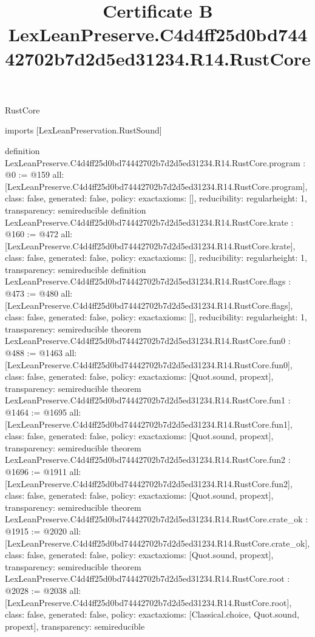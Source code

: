 \begin{lexlean}{RustCore}
\title{Certificate B LexLeanPreserve.C4d4ff25d0bd74442702b7d2d5ed31234.R14.RustCore}
\begin{coremodule}
imports [LexLeanPreservation.RustSound]

definition LexLeanPreserve.C4d4ff25d0bd74442702b7d2d5ed31234.R14.RustCore.program : @0 := @159 {
  all: [LexLeanPreserve.C4d4ff25d0bd74442702b7d2d5ed31234.R14.RustCore.program],
  class: false,
  generated: false,
  policy: exact{axioms: []},
  reducibility: regular{height: 1},
  transparency: semireducible
}
definition LexLeanPreserve.C4d4ff25d0bd74442702b7d2d5ed31234.R14.RustCore.krate : @160 := @472 {
  all: [LexLeanPreserve.C4d4ff25d0bd74442702b7d2d5ed31234.R14.RustCore.krate],
  class: false,
  generated: false,
  policy: exact{axioms: []},
  reducibility: regular{height: 1},
  transparency: semireducible
}
definition LexLeanPreserve.C4d4ff25d0bd74442702b7d2d5ed31234.R14.RustCore.flags : @473 := @480 {
  all: [LexLeanPreserve.C4d4ff25d0bd74442702b7d2d5ed31234.R14.RustCore.flags],
  class: false,
  generated: false,
  policy: exact{axioms: []},
  reducibility: regular{height: 1},
  transparency: semireducible
}
theorem LexLeanPreserve.C4d4ff25d0bd74442702b7d2d5ed31234.R14.RustCore.fun0 : @488 := @1463 {
  all: [LexLeanPreserve.C4d4ff25d0bd74442702b7d2d5ed31234.R14.RustCore.fun0],
  class: false,
  generated: false,
  policy: exact{axioms: [Quot.sound, propext]},
  transparency: semireducible
}
theorem LexLeanPreserve.C4d4ff25d0bd74442702b7d2d5ed31234.R14.RustCore.fun1 : @1464 := @1695 {
  all: [LexLeanPreserve.C4d4ff25d0bd74442702b7d2d5ed31234.R14.RustCore.fun1],
  class: false,
  generated: false,
  policy: exact{axioms: [Quot.sound, propext]},
  transparency: semireducible
}
theorem LexLeanPreserve.C4d4ff25d0bd74442702b7d2d5ed31234.R14.RustCore.fun2 : @1696 := @1911 {
  all: [LexLeanPreserve.C4d4ff25d0bd74442702b7d2d5ed31234.R14.RustCore.fun2],
  class: false,
  generated: false,
  policy: exact{axioms: [Quot.sound, propext]},
  transparency: semireducible
}
theorem LexLeanPreserve.C4d4ff25d0bd74442702b7d2d5ed31234.R14.RustCore.crate_ok : @1915 := @2020 {
  all: [LexLeanPreserve.C4d4ff25d0bd74442702b7d2d5ed31234.R14.RustCore.crate_ok],
  class: false,
  generated: false,
  policy: exact{axioms: [Quot.sound, propext]},
  transparency: semireducible
}
theorem LexLeanPreserve.C4d4ff25d0bd74442702b7d2d5ed31234.R14.RustCore.root : @2028 := @2038 {
  all: [LexLeanPreserve.C4d4ff25d0bd74442702b7d2d5ed31234.R14.RustCore.root],
  class: false,
  generated: false,
  policy: exact{axioms: [Classical.choice, Quot.sound, propext]},
  transparency: semireducible
}


\end{coremodule}
\end{lexlean}
